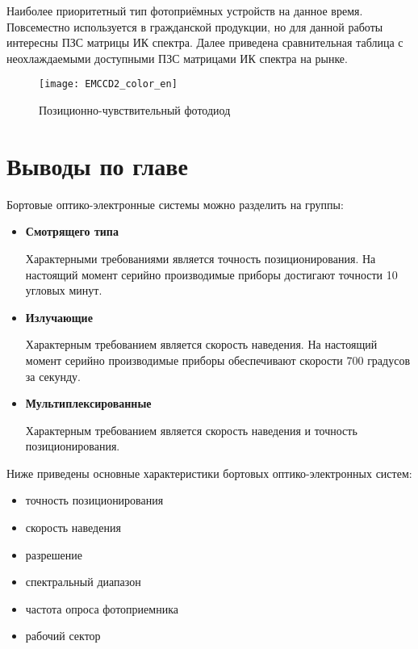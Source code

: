 \begin{itemize}
	Наиболее приоритетный тип фотоприёмных устройств на данное время. Повсеместно используется в гражданской продукции, но для данной работы интересны ПЗС матрицы ИК спектра. Далее приведена сравнительная таблица с неохлаждаемыми доступными ПЗС матрицами ИК спектра на рынке.
	
	\begin{figure}[ht]
		\centering
		\texttt{[image: EMCCD2\_color\_en]} 
		\caption{Позиционно-чувствительный фотодиод \cite[]{CCD2}}
		\label{fig:EMCCD2_color_en}
	\end{figure}
	
\end{itemize}


\section{Выводы по главе} \label{sec:ch1/sec4-}

Бортовые оптико-электронные системы можно разделить на группы:
\begin{itemize}
	\item \textbf{Смотрящего типа}
	
	Характерными требованиями является точность позиционирования. На настоящий момент серийно производимые приборы достигают точности 10 угловых минут.
	
		
	\item \textbf{Излучающие}
	
	Характерным требованием является скорость наведения. На настоящий момент серийно производимые приборы обеспечивают скорости 700 градусов за секунду.
	
	\item \textbf{Мультиплексированные}
	
	Характерным требованием является скорость наведения и точность позиционирования.
	
\end{itemize}

Ниже приведены основные характеристики бортовых оптико-электронных систем: 
\begin{itemize}
\item точность позиционирования 
\item скорость наведения
\item разрешение 
\item спектральный диапазон
\item частота опроса фотоприемника
\item рабочий сектор
\end{itemize}

